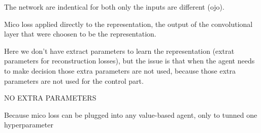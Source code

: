 The network are indentical for both only the inputs are different (ojo).

Mico loss applied directly to the representation, the output of the convolutional layer that were choosen to be the representation.

Here we don't have extract parameters to learn the representation (extrat parameters for reconstruction losses), but the issue is that when the agent needs to make decision those extra parameters are not used, because those extra parameters are not used for the control part.

NO EXTRA PARAMETERS

Because mico loss can be plugged into any value-based agent, only to tunned one hyperparameter
